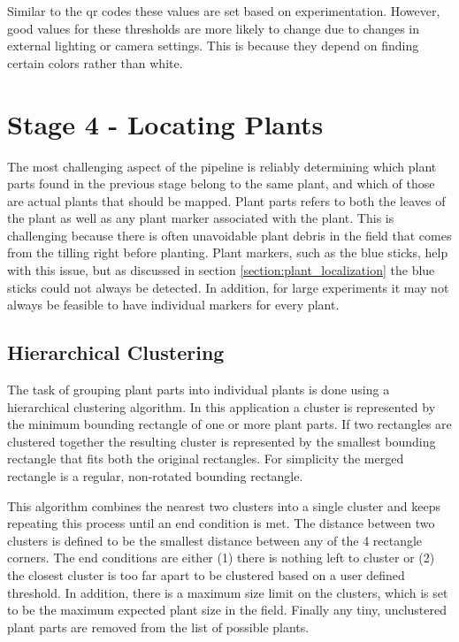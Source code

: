 Similar to the \ac{qr} codes these values are set based on experimentation.   However, good values for these thresholds are more likely to change due to changes in external lighting or camera settings.  This is because they depend on finding certain colors rather than white.  

\section{Stage 4 - Locating Plants}
\label{processing-stage4}

The most challenging aspect of the pipeline is reliably determining which plant parts found in the previous stage belong to the same plant, and which of those are actual plants that should be mapped.  Plant parts refers to both the leaves of the plant as well as any plant marker associated with the plant.  This is challenging because there is often unavoidable plant debris in the field that comes from the tilling right before planting. Plant markers, such as the blue sticks, help with this issue, but as discussed in section \ref{section:plant_localization} the blue sticks could not always be detected.  In addition, for large experiments it may not always be feasible to have individual markers for every plant.  

\subsection{Hierarchical Clustering}

The task of grouping plant parts into individual plants is done using a hierarchical clustering algorithm.  In this application a cluster is represented by the minimum bounding rectangle of one or more plant parts.  If two rectangles are clustered together the resulting cluster is represented by the smallest bounding rectangle that fits both the original rectangles.  For simplicity the merged rectangle is a regular, non-rotated bounding rectangle. 

This algorithm combines the nearest two clusters into a single cluster and keeps repeating this process until an end condition is met.  The distance between two clusters is defined to be the smallest distance between any of the 4 rectangle corners.  The end conditions are either (1) there is nothing left to cluster or (2) the closest cluster is too far apart to be clustered based on a user defined threshold.  In addition, there is a maximum size limit on the clusters, which is set to be the maximum expected plant size in the field.  Finally any tiny, unclustered plant parts are removed from the list of possible plants. 

